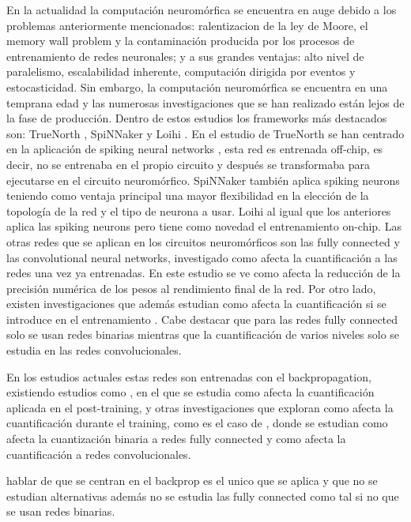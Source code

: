 En la actualidad la computación neuromórfica se encuentra en auge debido a los problemas anteriormente mencionados: ralentizacion de la ley de Moore, el memory wall problem y la contaminación producida por los procesos de entrenamiento de redes neuronales; y a sus  grandes ventajas: alto nivel de paralelismo, escalabilidad inherente, computación dirigida por eventos y estocasticidad. Sin embargo, la computación neuromórfica se encuentra en una temprana edad y las numerosas investigaciones que se han realizado están lejos de la fase de producción. Dentro de estos estudios los frameworks más destacados son: TrueNorth \cite{doi:10.1142/S0129065709002002}, SpiNNaker \cite{6750072} y Loihi \cite{8259423}. En el estudio de TrueNorth se han centrado en la aplicación de spiking neural networks \cite{doi:10.1142/S0129065709002002}, esta red es entrenada off-chip, es decir, no se entrenaba en el propio circuito y después se transformaba para ejecutarse en el circuito neuromórfico. SpiNNaker también aplica spiking neurons teniendo como ventaja principal una mayor flexibilidad en la elección de la topología de la red y el tipo de neurona a usar. Loihi al igual que los anteriores aplica las spiking neurons pero tiene como novedad el entrenamiento on-chip. Las otras redes que se aplican en los circuitos neuromórficos son las fully connected y las convolutional neural networks, investigado como afecta la cuantificación a las redes una vez ya entrenadas. En este estudio \cite{10481/72221} se ve como afecta la reducción de la precisión numérica de los pesos al rendimiento final de la red. Por otro lado, existen investigaciones que además estudian como afecta la cuantificación si se introduce en el entrenamiento \cite{8705375}. Cabe destacar que para las redes fully connected solo se usan redes binarias mientras que la cuantificación de varios niveles solo se estudia en las redes convolucionales.

En los estudios actuales estas redes son entrenadas con el backpropagation, existiendo estudios como \cite{10481/72221}, en el que se estudia como afecta la cuantificación aplicada en el post-training, y otras investigaciones que exploran como afecta la cuantificación durante el training, como es el caso de \cite{8705375}, donde se estudian como afecta la cuantización binaria a redes fully connected y como afecta la cuantificación a redes convolucionales. 

hablar de que se centran en el backprop es el unico que se aplica y que no se estudian alternativas además no se estudia las fully connected como tal si no que se usan redes binarias.

